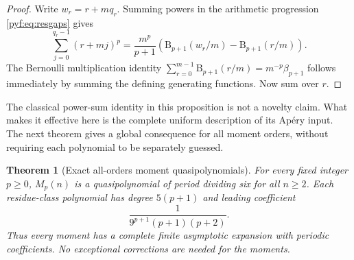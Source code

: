 \documentclass[11pt,a4paper]{article}
\numberwithin{equation}{section}
\newtheorem{theorem}{Theorem}[section]
\theoremstyle{definition}
\newcommand{\Bern}{\mathrm B}
\begin{document}
\begin{proof}
Write $w_r=r+m q_r$. Summing powers in the arithmetic progression
\eqref{pyf:eq:resgaps} gives
\[
\sum_{j=0}^{q_r-1}(r+mj)^p
=\frac{m^p}{p+1}
 \left(\Bern_{p+1}(w_r/m)-\Bern_{p+1}(r/m)\right).
\]
The Bernoulli multiplication identity
$\sum_{r=0}^{m-1}\Bern_{p+1}(r/m)=m^{-p}\beta_{p+1}$
follows immediately by summing the defining generating functions.
Now sum over $r$.
\end{proof}

The classical power-sum identity in this proposition is not a novelty claim.
What makes it effective here is the complete uniform description of its
Ap\'ery input. The next theorem gives a global consequence for all moment
orders, without requiring each polynomial to be separately guessed.

\begin{theorem}[Exact all-orders moment quasipolynomials]\label{pyf:thm:allmoments}
For every fixed integer $p\geq0$, $M_p(n)$ is a quasipolynomial of period
dividing six for all $n\geq2$. Each residue-class polynomial has degree
$5(p+1)$ and leading coefficient
\begin{equation}\label{pyf:eq:momentleading}
\frac{1}{9^{p+1}(p+1)(p+2)}.
\end{equation}
Thus every moment has a complete finite asymptotic expansion with periodic
coefficients. No exceptional corrections are needed for the moments.
\end{theorem}
\end{document}
